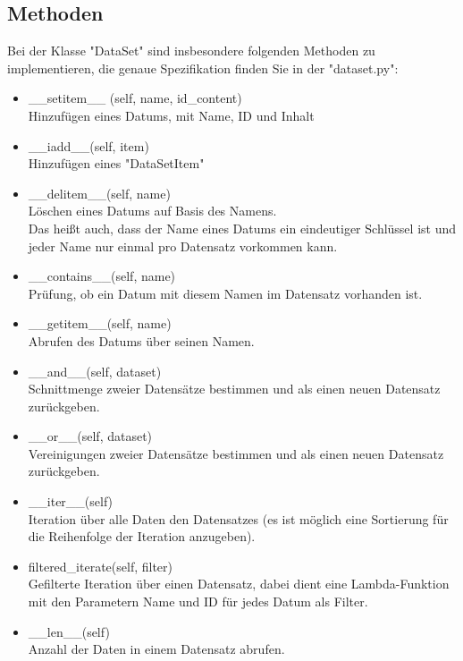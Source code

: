 \documentclass[
 12pt, %
 a4paper, %
 parskip=full %
]{scrartcl}
\begin{document}
    \subsection{Methoden}Bei der Klasse "DataSet" sind insbesondere folgenden Methoden zu implementieren, die genaue Spezifikation finden Sie in der "dataset.py":
    \begin{itemize}
        \item \_\_setitem\_\_ (self, name, id\_content) \\
        Hinzufügen eines Datums, mit Name, ID und Inhalt
        \item \_\_iadd\_\_(self, item)\\
         Hinzufügen eines "DataSetItem"
        \item\_\_delitem\_\_(self, name)\\
         Löschen eines Datums auf Basis des Namens.\\
         Das heißt auch, dass der Name eines Datums ein eindeutiger Schlüssel ist und jeder Name nur einmal pro Datensatz vorkommen kann.
        \item \_\_contains\_\_(self, name)\\
        Prüfung, ob ein Datum mit diesem Namen im Datensatz vorhanden ist.
        \item \_\_getitem\_\_(self, name)\\
         Abrufen des Datums über seinen Namen. 
       \item \_\_and\_\_(self, dataset)\\
        Schnittmenge zweier Datensätze bestimmen und als einen neuen Datensatz zurückgeben.
       \item \_\_or\_\_(self, dataset)\\
        Vereinigungen zweier Datensätze bestimmen und als einen neuen Datensatz zurückgeben.
        \item \_\_iter\_\_(self)\\
        Iteration über alle Daten den Datensatzes (es ist möglich eine Sortierung für die Reihenfolge der Iteration anzugeben).
        \item filtered\_iterate(self, filter)\\
        Gefilterte Iteration über einen Datensatz, dabei dient eine Lambda-Funktion mit den Parametern Name und ID für jedes Datum als Filter.
        \item \_\_len\_\_(self)\\
         Anzahl der Daten in einem Datensatz abrufen.
        
    \end{itemize}
\end{document}
